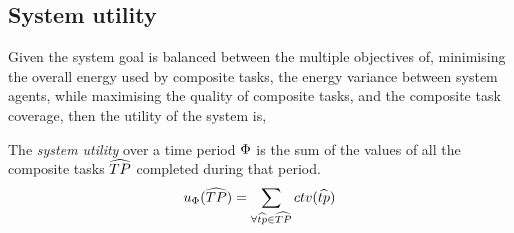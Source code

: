 \subsection{System utility}
\newcommand{\functionSystemUtility}[2]{\functionSignature{u_{\setTime{}{}}}{\setCompositeTask{}{}}}

Given the system goal is balanced between the multiple objectives of, minimising the overall energy used by composite tasks, the energy variance between system agents, while maximising the quality of composite tasks, and the composite task coverage, then the utility of the system is,

\begin{definition}
	The \textit{system utility} over a time period $\Phi$ is the sum of the values of all the composite tasks $\setCompositeTask{}{}$ completed during that period.
	\begin{equation}
		\functionSystemUtility{}{} = \sum_{\forall \varCompositeTask{}{} \in \setCompositeTask{}{}}
		\functionCompositeTaskValue{}{}
	\end{equation}
\end{definition}

